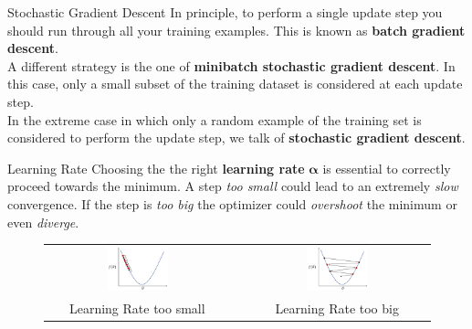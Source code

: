 \documentclass[aspectratio=169]{beamer}
\begin{document}

\begin{frame}{Stochastic Gradient Descent}
In principle, to perform a single update step you should run through all your training examples. This is known as \textbf{batch gradient descent}.\\
\vspace{0.5cm}
A different strategy is the one of \textbf{minibatch stochastic gradient descent}. In this case, only a small subset of the training dataset is considered at each update step.\\
\vspace{0.5cm}
In the extreme case in which only a random example of the training set is considered to perform the update step, we talk of \textbf{stochastic gradient descent}.

\end{frame}


\begin{frame}{Learning Rate}
Choosing the the right \textbf{learning rate} $\bm{\alpha}$ is essential to correctly proceed towards the minimum. A step \textit{too small} could lead to an extremely \textit{slow} convergence. If the step is \textit{too big} the optimizer could \textit{overshoot} the minimum or even \textit{diverge}. 
\begin{figure}
\begin{tabular}{ccc}
\includegraphics[width=0.35\textwidth]{img/sgd/lr_too_small.png} &
\quad &
\includegraphics[width=0.35\textwidth]{img/sgd/lr_too_big.png}\\
Learning Rate too small & & Learning Rate too big
\end{tabular}
\end{figure}

\end{frame}
\end{document}
